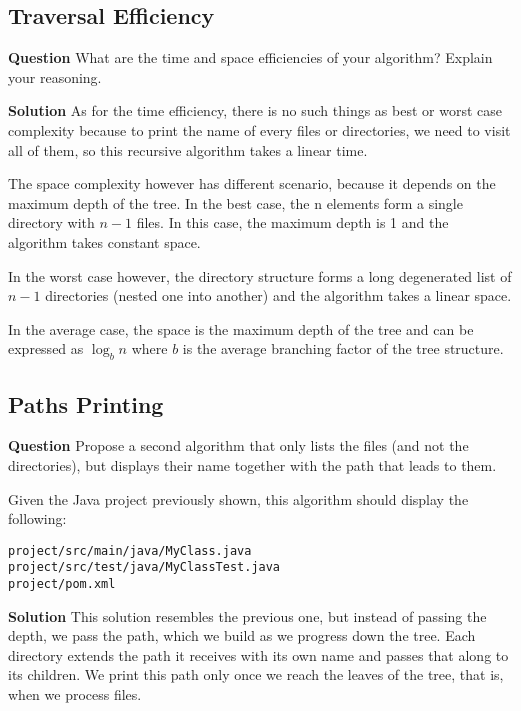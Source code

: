 \documentclass[11pt]{article}
\begin{document}
\subsection{Traversal Efficiency}
\label{sec:orgdee7837}

\textbf{Question} What are the time and space efficiencies of your
   algorithm? Explain your reasoning.

\textbf{Solution} As for the time efficiency, there is no such things as
best or worst case complexity because to print the name of every
files or directories, we need to visit all of them, so this
recursive algorithm takes a linear time.

The space complexity however has different scenario, because it
depends on the maximum depth of the tree. In the best case, the n
elements form a single directory with \(n-1\) files. In this case, the
maximum depth is 1 and the algorithm takes constant space.

In the worst case however, the directory structure forms a long
degenerated list of \(n-1\) directories (nested one into another) and the
algorithm takes a linear space.

In the average case, the space is the maximum depth of the tree and
can be expressed as \(\log_b n\) where \(b\) is the average branching
factor of the tree structure.


\subsection{Paths Printing}
\label{sec:org1f24c0d}
\textbf{Question} Propose a second algorithm that only lists the files
  (and not the directories), but displays their name together with
  the path that leads to them.

Given the Java project previously shown, this algorithm should
display the following:

\begin{verbatim}
project/src/main/java/MyClass.java
project/src/test/java/MyClassTest.java
project/pom.xml
\end{verbatim}

\textbf{Solution} This solution resembles the previous one, but instead of
  passing the depth, we pass the path, which we build as we
  progress down the tree. Each directory extends the path it
  receives with its own name and passes that along to its
  children. We print this path only once we reach the leaves of the
  tree, that is, when we process files.
\end{document}
